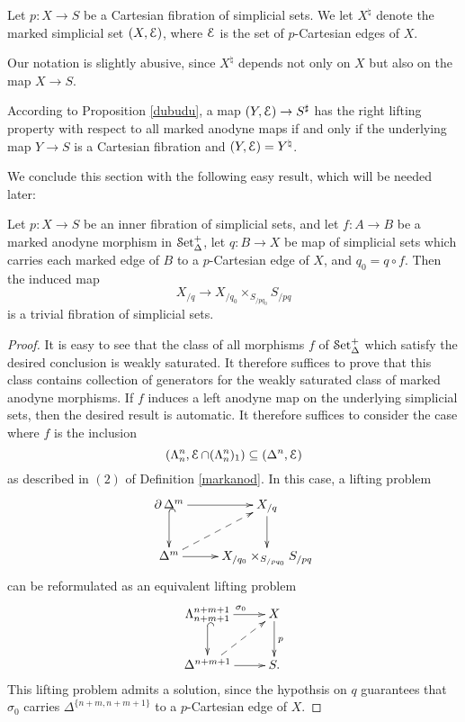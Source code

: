 \begin{definition}\label{conf1}
Let $p: X \rightarrow S$ be a Cartesian fibration of simplicial sets. We let
$X^{\natural}$ denote the marked simplicial set $(X, \operatorname{\mathcal{E}})$, where $\operatorname{\mathcal{E}}$ is the set of
$p$-Cartesian edges of $X$.
\end{definition}

\begin{remark}\label{abus}
Our notation is slightly abusive, since $X^{\natural}$ depends not only on $X$ but also
on the map $X \rightarrow S$. 
\end{remark}

\begin{remark}\label{abuss}
According to Proposition \ref{dubudu}, a map
$(Y, \operatorname{\mathcal{E}}) \rightarrow S^{\sharp}$ has the right lifting property with respect to all marked anodyne maps if and only if the underlying map $Y \rightarrow S$ is a Cartesian fibration and
$(Y, \operatorname{\mathcal{E}}) = Y^{\natural}$. 
\end{remark}

We conclude this section with the following easy result, which will be needed later:

\begin{proposition}\label{eggwhite}
Let $p: X \rightarrow S$ be an inner fibration of simplicial sets, and let $f: A \rightarrow B$
be a marked anodyne morphism in $\operatorname{\mathcal{S}et_{\Delta}^{+}}$, let
$q: B \rightarrow X$ be map of simplicial sets which carries each marked edge of $B$
to a $p$-Cartesian edge of $X$, and $q_0 = q \circ f$. 
Then the induced map
$$ X_{/q} \rightarrow X_{/q_0} \times_{S_{/pq_0}} S_{/pq}$$
is a trivial fibration of simplicial sets. 
\end{proposition}

\begin{proof}
It is easy to see that the class of all morphisms $f$ of $\operatorname{\mathcal{S}et_{\Delta}^{+}}$ which satisfy the desired conclusion is weakly saturated. It therefore suffices to prove that this class contains collection of generators for the weakly saturated class of marked anodyne morphisms.
If $f$ induces a left anodyne map on the underlying simplicial sets, then the desired result is automatic. It therefore suffices to consider the case where $f$ is the inclusion
$$ ( \Lambda^n_n, \operatorname{\mathcal{E}} \cap (\Lambda^n_n)_{1} ) \subseteq ( \Delta^n, \operatorname{\mathcal{E}} )$$
as described in $(2)$ of Definition \ref{markanod}. In this case, a lifting problem
$$ \xymatrix{ \bd \Delta^m \ar[r] \ar@{^{(}->}[d] & X_{/q} \ar[d] \\
\Delta^m \ar[r] \ar@{-->}[ur] & X_{/q_0} \times_{S_{/pq_0}} S_{/pq} }$$
can be reformulated as an equivalent lifting problem
$$ \xymatrix{ \Lambda^{n+m+1}_{n+m+1} \ar[r]^{\sigma_0} \ar@{^{(}->}[d] & X \ar[d]^{p} \\
\Delta^{n+m+1} \ar[r] \ar@{-->}[ur] & S. }$$
This lifting problem admits a solution, since the hypothsis on $q$ guarantees
that $\sigma_0$ carries $\Delta^{ \{n+m, n+m+1\} }$ to a $p$-Cartesian edge of $X$.
\end{proof}

